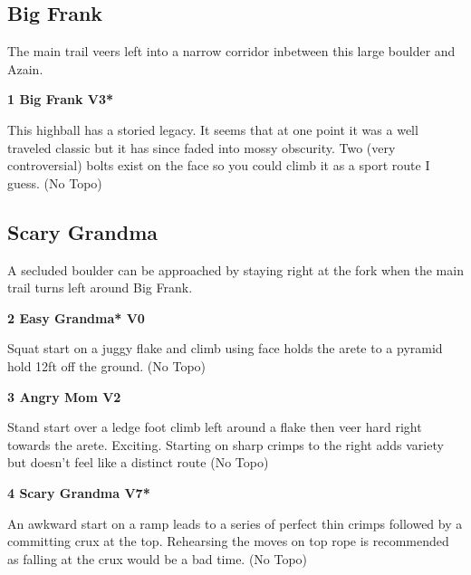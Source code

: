 \begin{multicols}{2}
	
			\subsection*{Big Frank}\label{bf:Big Frank}
			The main trail veers left into a narrow corridor inbetween this large boulder and Azain.\\
			
					\label{rt:Big Frank}
\colorbox{green!20}{
\parbox{0.95\linewidth}{
\textbf{
1 Big Frank V3*  
}
}
}

					\begin{adjustwidth}{0.5cm}{}				
					This highball has a storied legacy. It seems that at one point it was a well traveled classic but it has since faded into mossy obscurity. Two (very controversial) bolts exist on the face so you could climb it as a sport route I guess.
						\newline (No Topo) 
					\end{adjustwidth}
			\subsection*{Scary Grandma}\label{bf:Scary Grandma}
			A secluded boulder can be approached by staying right at the fork when the main trail turns left around Big Frank.\\
			
					\label{rt:Easy Grandma}
\colorbox{green!20}{
\parbox{0.95\linewidth}{
\textbf{
2 Easy Grandma* V0  
}
}
}

					\begin{adjustwidth}{0.5cm}{}				
					Squat start on a juggy flake and climb using face holds the arete to a pyramid hold 12ft off the ground.
						\newline (No Topo) 
					\end{adjustwidth}
					\label{rt:Angry Mom}
\colorbox{green!20}{
\parbox{0.95\linewidth}{
\textbf{
3 Angry Mom V2  \warn
}
}
}

					\begin{adjustwidth}{0.5cm}{}				
					Stand start over a ledge foot climb left around a flake then veer hard right towards the arete. Exciting. Starting on sharp crimps to the right adds variety but doesn't feel like a distinct route
						\newline (No Topo) 
					\end{adjustwidth}
					\label{rt:Scary Grandma}
\colorbox{Goldenrod!50}{
\parbox{0.95\linewidth}{
\textbf{
4 Scary Grandma V7*  \warn\warn
}
}
}

					\begin{adjustwidth}{0.5cm}{}				
					An awkward start on a ramp leads to a series of perfect thin crimps followed by a committing crux at the top. Rehearsing the moves on top rope is recommended as falling at the crux would be a bad time.
						\newline (No Topo) 
					\end{adjustwidth}
\end{multicols}
\clearpage